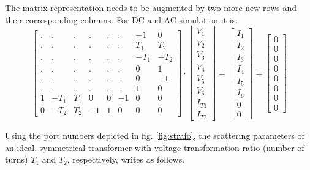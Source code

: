 The matrix representation needs to be augmented by two more new rows
and their corresponding columns. For DC and AC simulation it is:
\begin{equation}
\begin{bmatrix}
.&.&.&.&.&.& -1 & 0\\
.&.&.&.&.&.& T_{1} & T_{2}\\
.&.&.&.&.&.& -T_{1} & -T_{2}\\
.&.&.&.&.&.& 0 & 1\\
.&.&.&.&.&.& 0 & -1\\
.&.&.&.&.&.& 1 & 0\\
1 & -T_{1} & T_{1} & 0 & 0 & -1 & 0 & 0\\
0 & -T_{2} & T_{2} & -1 & 1 & 0 & 0 & 0
\end{bmatrix}
\cdot
\begin{bmatrix}
V_{1}\\
V_{2}\\
V_{3}\\
V_{4}\\
V_{5}\\
V_{6}\\
I_{T1}\\
I_{T2}
\end{bmatrix}
=
\begin{bmatrix}
I_{1}\\
I_{2}\\
I_{3}\\
I_{4}\\
I_{5}\\
I_{6}\\
0\\
0
\end{bmatrix}
=
\begin{bmatrix}
0\\
0\\
0\\
0\\
0\\
0\\
0\\
0
\end{bmatrix}
\end{equation}

Using the port numbers depicted in fig. \ref{fig:strafo}, the
scattering parameters of an ideal, symmetrical transformer with
voltage transformation ratio (number of turns) $T_1$ and $T_2$,
respectively, writes as follows.

